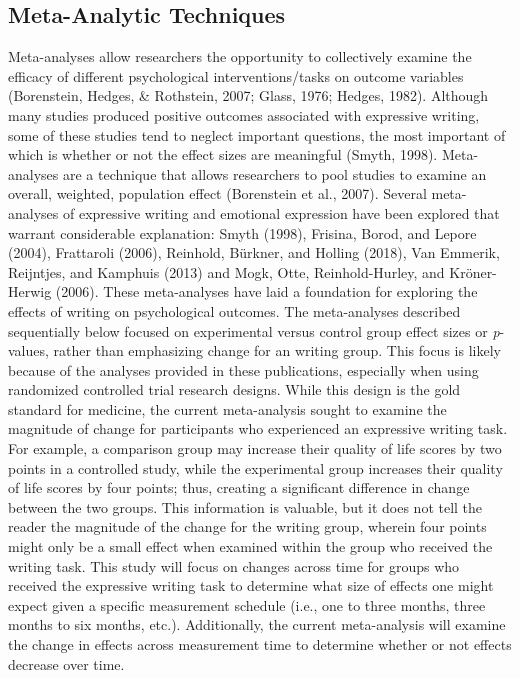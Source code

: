 \documentclass[english,man, mask]{apa6}
\theoremstyle{definition}
\theoremstyle{definition}
\theoremstyle{definition}
\theoremstyle{remark}
\begin{document}
\subsection{Meta-Analytic Techniques}\label{meta-analytic-techniques}

Meta-analyses allow researchers the opportunity to collectively examine
the efficacy of different psychological interventions/tasks on outcome
variables (Borenstein, Hedges, \& Rothstein, 2007; Glass, 1976; Hedges,
1982). Although many studies produced positive outcomes associated with
expressive writing, some of these studies tend to neglect important
questions, the most important of which is whether or not the effect
sizes are meaningful (Smyth, 1998). Meta-analyses are a technique that
allows researchers to pool studies to examine an overall, weighted,
population effect (Borenstein et al., 2007). Several meta-analyses of
expressive writing and emotional expression have been explored that
warrant considerable explanation: Smyth (1998), Frisina, Borod, and
Lepore (2004), Frattaroli (2006), Reinhold, Bürkner, and Holling (2018),
Van Emmerik, Reijntjes, and Kamphuis (2013) and Mogk, Otte,
Reinhold-Hurley, and Kröner-Herwig (2006). These meta-analyses have laid
a foundation for exploring the effects of writing on psychological
outcomes. The meta-analyses described sequentially below focused on
experimental versus control group effect sizes or \emph{p}-values,
rather than emphasizing change for an writing group. This focus is
likely because of the analyses provided in these publications,
especially when using randomized controlled trial research designs.
While this design is the gold standard for medicine, the current
meta-analysis sought to examine the magnitude of change for participants
who experienced an expressive writing task. For example, a comparison
group may increase their quality of life scores by two points in a
controlled study, while the experimental group increases their quality
of life scores by four points; thus, creating a significant difference
in change between the two groups. This information is valuable, but it
does not tell the reader the magnitude of the change for the writing
group, wherein four points might only be a small effect when examined
within the group who received the writing task. This study will focus on
changes across time for groups who received the expressive writing task
to determine what size of effects one might expect given a specific
measurement schedule (i.e., one to three months, three months to six
months, etc.). Additionally, the current meta-analysis will examine the
change in effects across measurement time to determine whether or not
effects decrease over time.
\end{document}
